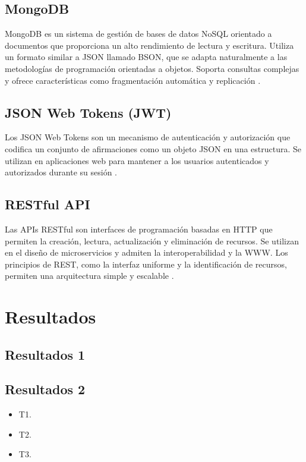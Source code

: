 \documentclass[conference]{IEEEtran}
\begin{document}
\subsection{MongoDB}
MongoDB es un sistema de gestión de bases de datos NoSQL orientado a documentos que proporciona un alto rendimiento de lectura y escritura. Utiliza un formato similar a JSON llamado BSON, que se adapta naturalmente a las metodologías de programación orientadas a objetos. Soporta consultas complejas y ofrece características como fragmentación automática y replicación \cite{krishnan2016}.

\subsection{JSON Web Tokens (JWT)}
Los JSON Web Tokens son un mecanismo de autenticación y autorización que codifica un conjunto de afirmaciones como un objeto JSON en una estructura. Se utilizan en aplicaciones web para mantener a los usuarios autenticados y autorizados durante su sesión \cite{IETF2015}.

\subsection{RESTful API}
Las APIs RESTful son interfaces de programación basadas en HTTP que permiten la creación, lectura, actualización y eliminación de recursos. Se utilizan en el diseño de microservicios y admiten la interoperabilidad y la WWW. Los principios de REST, como la interfaz uniforme y la identificación de recursos, permiten una arquitectura simple y escalable \cite{ehsan2022}.


\section{Resultados}
\label{sec:Res}
\subsection{Resultados 1}

\subsection{Resultados 2}

\begin{itemize}
    \item T1.
    \item T2.
    \item T3.
\end{itemize}
\end{document}
